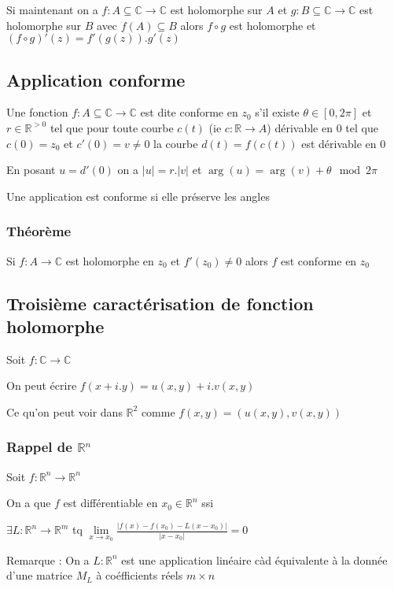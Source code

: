 \documentclass[a4paper,10pt]{report}
\newcommand{\rd}{\circ}
\newcommand{\ap}{\rightarrow}
\newcommand{\R}{\mathbb{R}}
\newcommand{\C}{\mathbb{C}}
\newcommand{\abs}[1]{\left\vert #1 \right\vert}
\newcommand{\clim}[1]{\lim\limits_{#1}}
\begin{document}
Si maintenant on a $f : A \subseteq \C \ap \C$ est holomorphe sur $A$ et $g : B \subseteq \C \ap \C$ est holomorphe sur $B$ avec $f(A) \subseteq B$ alors $f \rd g$ est holomorphe et $(f \rd g)'(z) = f'(g(z)).g'(z)$

\subsection{Application conforme}


Une fonction $f:A \subseteq \C \ap \C$ est dite conforme en $z_0$ s'il existe
$\theta \in [0, 2\pi ]$ et $r \in \R^{>0}$ tel que pour toute courbe $c(t)$
(ie $c : \R \ap A$) dérivable en $0$ tel que $c(0) = z_0$ et $c'(0)
= v \neq 0$ la courbe $d(t) = f(c(t))$ est dérivable en $0$

En posant $u =d'(0)$ on a $\abs{u} = r.\abs{v}$ et $\arg(u) = \arg(v)
+ \theta \mod 2\pi$

Une application est conforme si elle préserve les angles

\subsubsection{Théorème}

Si $f : A \ap \C$ est holomorphe en $z_0$ et $f'(z_0) \neq 0$ alors $f$
est conforme en $z_0$

\subsection{Troisième caractérisation de fonction holomorphe}

Soit $f : \C \ap \C$

On peut écrire $f(x + i.y) = u(x,y) + i. v(x,y)$

Ce qu'on peut voir dans $\R^2$ comme $f(x,y) = (u(x,y),v(x,y))$

\subsubsection{Rappel de $\R^n$}

Soit $f : \R^n \ap \R^n$

On a que $f$ est différentiable en $x_0 \in \R^n$ ssi

$\exists L : \R^n \ap \R^m$ tq $\clim{x \ap x_0} \frac{\abs{f(x) - f(x_0) - L(x - x_0)}}{\abs{x-x_0}} = 0$

Remarque : On a $L : \R^n$ est une application linéaire càd équivalente à la donnée d'une matrice $M_L$ à coéfficients réels $m \times n$
\end{document}
